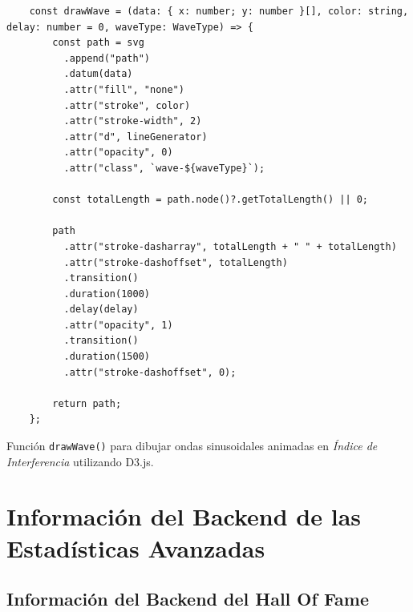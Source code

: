 \begin{ifalgorithm}[H]
    \begin{lstlisting}
    const drawWave = (data: { x: number; y: number }[], color: string, delay: number = 0, waveType: WaveType) => {
        const path = svg
          .append("path")
          .datum(data)
          .attr("fill", "none")
          .attr("stroke", color)
          .attr("stroke-width", 2)
          .attr("d", lineGenerator)
          .attr("opacity", 0)
          .attr("class", `wave-${waveType}`);

        const totalLength = path.node()?.getTotalLength() || 0;

        path
          .attr("stroke-dasharray", totalLength + " " + totalLength)
          .attr("stroke-dashoffset", totalLength)
          .transition()
          .duration(1000)
          .delay(delay)
          .attr("opacity", 1)
          .transition()
          .duration(1500)
          .attr("stroke-dashoffset", 0);

        return path;
    };
    \end{lstlisting}
    \caption{Función \texttt{drawWave()} para dibujar ondas sinusoidales animadas en \textit{Índice de Interferencia} utilizando D3.js.}
    \label{alg:draw_wave}
\end{ifalgorithm}



\chapter{Información del Backend de las Estadísticas Avanzadas} \label{ch:anexoD}

\section{Información del Backend del Hall Of Fame} \label{sec:backend_hall_of_fame}

